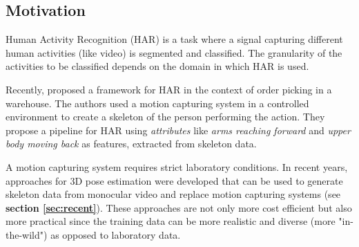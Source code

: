 \documentclass[twoside]{article}
\begin{document}
\begin{multicols}{2} %

\section{Motivation}
\label{sec:motivation}







Human Activity Recognition (HAR) is a task where a signal capturing different human activities (like video) is segmented and classified.
The granularity of the activities to be classified depends on the domain in which HAR is used.

Recently,\cite{reining_towards_2018} proposed a framework for HAR in the context of order picking in a warehouse.
The authors used a motion capturing system in a controlled environment to create a skeleton of the person performing the action.
They propose a pipeline for HAR using \textit{attributes} like \textit{arms reaching forward} and \textit{upper body moving back} as features, extracted from skeleton data.

A motion capturing system requires strict laboratory conditions.
In recent years, approaches for 3D pose estimation were developed that can be used to generate skeleton data from monocular video and replace motion capturing systems (see \textbf{section \ref{sec:recent}}).
These approaches are not only more cost efficient but also more practical since the training data can be more realistic and diverse (more "in-the-wild") as opposed to laboratory data.


\end{multicols}
\end{document}
